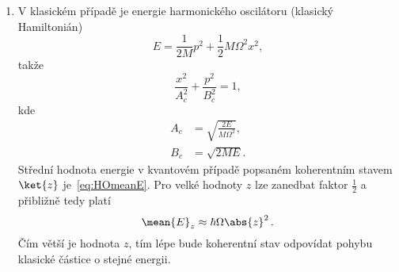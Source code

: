 \begin{solution}
\begin{enumerate}
	\item
		V klasickém případě je energie harmonického oscilátoru (klasický Hamiltonián)
		\begin{equation}
			\label{eq:HOCoherentStateClassicalMotion}
			E=\frac{1}{2M}p^{2}+\frac{1}{2}M\Omega^{2}x^{2},
		\end{equation}
		takže
		\begin{equation}
			\frac{x^{2}}{A_{c}^{2}}+\frac{p^{2}}{B_{c}^{2}}=1,
		\end{equation}
		kde
		\begin{subequations}
			\begin{align}
				A_{c}&=\sqrt{\frac{2E}{M\Omega^{2}}},\\
				B_{c}&=\sqrt{2ME}.
			\end{align}
		\end{subequations}
		Střední hodnota energie v kvantovém případě popsaném koherentním stavem $\ket{z}$ je~\eqref{eq:HOmeanE}.
		Pro velké hodnoty $z$ lze zanedbat faktor $\frac{1}{2}$ a přibližně tedy platí
		\begin{equation}
			\mean{E}_{z}\approx\hbar\Omega\abs{z}^{2}\,.
		\end{equation}
		Čím větší je hodnota $z$, tím lépe bude koherentní stav odpovídat pohybu klasické částice o stejné energii.
	\end{enumerate}
\end{solution}    

